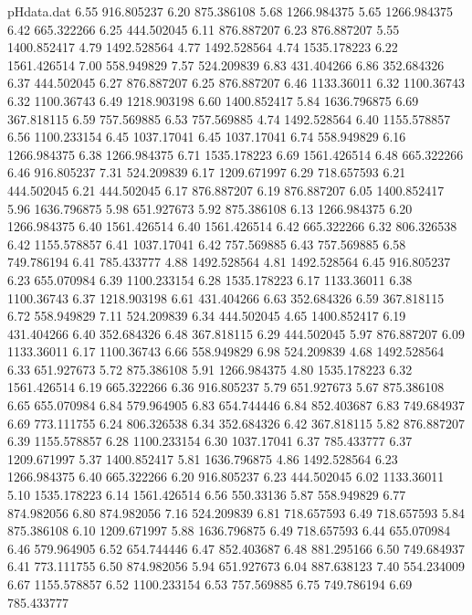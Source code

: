 \begin{filecontents}{pHdata.dat}
6.55 	916.805237
6.20 	875.386108
5.68 	1266.984375
5.65 	1266.984375
6.42 	665.322266
6.25 	444.502045
6.11 	876.887207
6.23 	876.887207
5.55 	1400.852417
4.79 	1492.528564
4.77 	1492.528564
4.74 	1535.178223
6.22 	1561.426514
7.00 	558.949829
7.57 	524.209839
6.83 	431.404266
6.86 	352.684326
6.37 	444.502045
6.27 	876.887207
6.25 	876.887207
6.46 	1133.36011
6.32 	1100.36743
6.32 	1100.36743
6.49 	1218.903198
6.60 	1400.852417
5.84 	1636.796875
6.69 	367.818115
6.59 	757.569885
6.53 	757.569885
4.74 	1492.528564
6.40 	1155.578857
6.56 	1100.233154
6.45 	1037.17041
6.45 	1037.17041
6.74 	558.949829
6.16 	1266.984375
6.38 	1266.984375
6.71 	1535.178223
6.69 	1561.426514
6.48 	665.322266
6.46 	916.805237
7.31 	524.209839
6.17 	1209.671997
6.29 	718.657593
6.21 	444.502045
6.21 	444.502045
6.17 	876.887207
6.19 	876.887207
6.05 	1400.852417
5.96 	1636.796875
5.98 	651.927673
5.92 	875.386108
6.13 	1266.984375
6.20 	1266.984375
6.40 	1561.426514
6.40 	1561.426514
6.42 	665.322266
6.32 	806.326538
6.42 	1155.578857
6.41 	1037.17041
6.42 	757.569885
6.43 	757.569885
6.58 	749.786194
6.41 	785.433777
4.88 	1492.528564
4.81 	1492.528564
6.45 	916.805237
6.23 	655.070984
6.39 	1100.233154
6.28 	1535.178223
6.17 	1133.36011
6.38 	1100.36743
6.37 	1218.903198
6.61 	431.404266
6.63 	352.684326
6.59 	367.818115
6.72 	558.949829
7.11 	524.209839
6.34 	444.502045
4.65 	1400.852417
6.19 	431.404266
6.40 	352.684326
6.48 	367.818115
6.29 	444.502045
5.97 	876.887207
6.09 	1133.36011
6.17 	1100.36743
6.66 	558.949829
6.98 	524.209839
4.68 	1492.528564
6.33 	651.927673
5.72 	875.386108
5.91 	1266.984375
4.80 	1535.178223
6.32 	1561.426514
6.19 	665.322266
6.36 	916.805237
5.79 	651.927673
5.67 	875.386108
6.65 	655.070984
6.84 	579.964905
6.83 	654.744446
6.84 	852.403687
6.83 	749.684937
6.69 	773.111755
6.24 	806.326538
6.34 	352.684326
6.42 	367.818115
5.82 	876.887207
6.39 	1155.578857
6.28 	1100.233154
6.30 	1037.17041
6.37 	785.433777
6.37 	1209.671997
5.37 	1400.852417
5.81 	1636.796875
4.86 	1492.528564
6.23 	1266.984375
6.40 	665.322266
6.20 	916.805237
6.23 	444.502045
6.02 	1133.36011
5.10 	1535.178223
6.14 	1561.426514
6.56 	550.33136
5.87 	558.949829
6.77 	874.982056
6.80 	874.982056
7.16 	524.209839
6.81 	718.657593
6.49 	718.657593
5.84 	875.386108
6.10 	1209.671997
5.88 	1636.796875
6.49 	718.657593
6.44 	655.070984
6.46 	579.964905
6.52 	654.744446
6.47 	852.403687
6.48 	881.295166
6.50 	749.684937
6.41 	773.111755
6.50 	874.982056
5.94 	651.927673
6.04 	887.638123
7.40 	554.234009
6.67 	1155.578857
6.52 	1100.233154
6.53 	757.569885
6.75 	749.786194
6.69 	785.433777

\end{filecontents}
